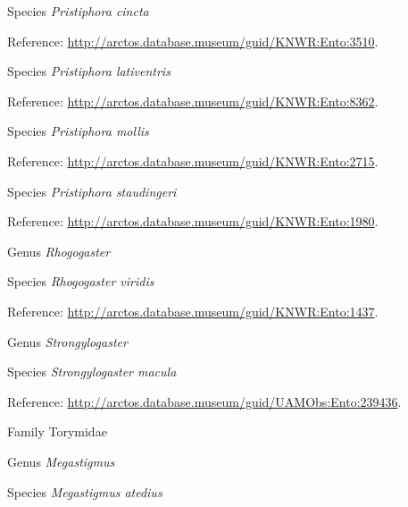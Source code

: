 \documentclass[9pt, article]{memoir}
\begin{document}
\begin{multicols}{2}
\vspace{6pt}\noindent\hspace{36pt}Species \textit{Pristiphora cincta}


Reference: 
\url{http://arctos.database.museum/guid/KNWR:Ento:3510}.

\vspace{6pt}\noindent\hspace{36pt}Species \textit{Pristiphora lativentris}


Reference: 
\url{http://arctos.database.museum/guid/KNWR:Ento:8362}.

\vspace{6pt}\noindent\hspace{36pt}Species \textit{Pristiphora mollis}


Reference: 
\url{http://arctos.database.museum/guid/KNWR:Ento:2715}.

\vspace{6pt}\noindent\hspace{36pt}Species \textit{Pristiphora staudingeri}


Reference: 
\url{http://arctos.database.museum/guid/KNWR:Ento:1980}.

\vspace{6pt}\noindent\hspace{30pt}Genus \textit{Rhogogaster}


\vspace{6pt}\noindent\hspace{36pt}Species \textit{Rhogogaster viridis}


Reference: 
\url{http://arctos.database.museum/guid/KNWR:Ento:1437}.

\vspace{6pt}\noindent\hspace{30pt}Genus \textit{Strongylogaster}


\vspace{6pt}\noindent\hspace{36pt}Species \textit{Strongylogaster macula}


Reference: 
\url{http://arctos.database.museum/guid/UAMObs:Ento:239436}.

\vspace{6pt}\noindent\hspace{24pt}Family Torymidae


\vspace{6pt}\noindent\hspace{30pt}Genus \textit{Megastigmus}


\vspace{6pt}\noindent\hspace{36pt}Species \textit{Megastigmus atedius}



\end{multicols}
\end{document}
